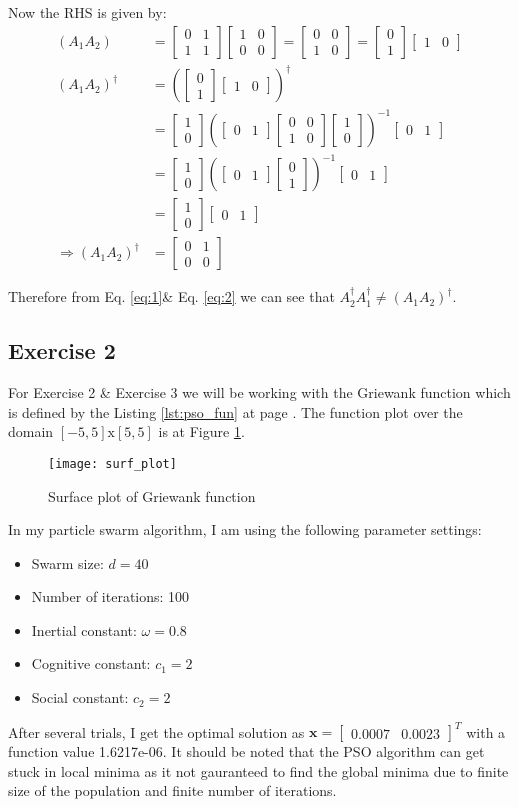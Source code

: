 \documentclass[11pt]{article}
\newcommand{\V}[1]{\pmb{#1}}
\newcommand{\mat}[1]{\begin{bmatrix}#1\end{bmatrix}}
\newcommand{\refEq}[1]{Eq. \ref{#1}}
\newcommand{\reflst}[1]{Listing \ref{#1} at page \pageref{#1}}
\newcommand{\reffig}[1]{Figure \ref{#1}}
\begin{document}
Now the RHS is given by:
\begin{align}
 (A_1A_2) &= \mat{ 0 & 1\\ 1& 1}\mat{1 & 0\\ 0& 0} = \mat{0 & 0\\ 1 & 0} = \mat{0 \\1}\mat{1 &0 } \nonumber\\
 (A_1A_2)^{\dagger} &=  (\mat{0 \\1}\mat{1 &0 })^{\dagger} \nonumber\\
 & = \mat{1 \\0} \left( \mat{0 & 1} \mat{0 & 0\\ 1 & 0} \mat{1 \\0}\right)^{-1} \mat{0 &1} \nonumber\\
 & = \mat{1 \\0} \left( \mat{0 & 1} \mat{0 \\1}\right)^{-1} \mat{0 &1} \nonumber\\
 & = \mat{1 \\0} \mat{0 &1} \nonumber\\
 \Rightarrow (A_1A_2)^{\dagger} &= \mat{0 & 1\\ 0 & 0} \label{eq:2}
\end{align}

Therefore from \refEq{eq:1}\& \refEq{eq:2} we can see that $A_2^{\dagger}A_1^{\dagger} \neq (A_1A_2)^{\dagger}$.

%
\newpage
\vspace{2ex}
%
\subsection*{Exercise 2} 

For Exercise 2 \& Exercise 3 we will be working with the Griewank function which is defined by the \reflst{lst:pso_fun}. The function plot over the domain $[-5,5]\text{x}[5,5]$ is at \reffig{fig:pso_fun}.

\begin{figure}[!h]
 \centering
 \texttt{[image: surf\_plot]}
 \caption{Surface plot of Griewank function}
 \label{fig:pso_fun}
\end{figure}

In my particle swarm algorithm, I am using the following parameter settings:
\begin{itemize}
 \item Swarm size: $d=40$
 \item Number of iterations: 100
 \item Inertial constant: $\omega = 0.8$
 \item Cognitive constant: $c_1 = 2$
 \item Social constant: $c_2 = 2$
\end{itemize}
After several trials, I get the optimal solution as $\V{x}=\mat{0.0007 & 0.0023}^T$ with a function value 1.6217e-06. It should be noted that the PSO algorithm can get stuck in local minima as it not gauranteed to find the global minima due to finite size of the population and finite number of iterations.
\end{document}
